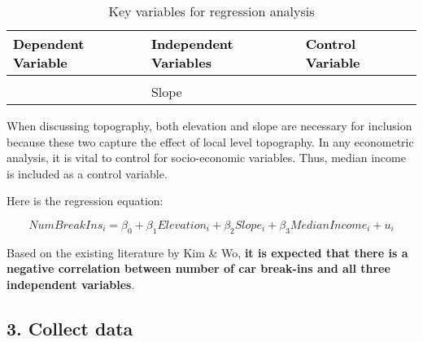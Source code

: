 \documentclass[
]{article}
\begin{document}
\begin{table}

\caption{\label{tab:unnamed-chunk-2}Key variables for regression analysis}
\centering
\fontsize{15}{17}\selectfont
\begin{tabular}[t]{>{}l|l|l}
\hline
\textcolor{black}{\textbf{Dependent Variable}} & \textcolor{black}{\textbf{Independent Variables}} & \textcolor{black}{\textbf{Control Variable}}\\
\hline
\textbf{\cellcolor{gray!6}{Number of Car Break-Ins}} & \cellcolor{gray!6}{Elevation} & \cellcolor{gray!6}{Median Income}\\
\hline
\textbf{} & Slope & \\
\hline
\end{tabular}
\end{table}

When discussing topography, both elevation and slope are necessary for
inclusion because these two capture the effect of local level
topography. In any econometric analysis, it is vital to control for
socio-economic variables. Thus, median income is included as a control
variable.

Here is the regression equation:

\[NumBreakIns_i = \beta_0 + \beta_1Elevation_i + \beta_2Slope_i + \beta_3MedianIncome_i + u_i\]

Based on the existing literature by Kim \& Wo, \textbf{it is expected
that there is a negative correlation between number of car break-ins and
all three independent variables}.

\hypertarget{collect-data}{%
\subsection{3. Collect data}\label{collect-data}}
\end{document}

